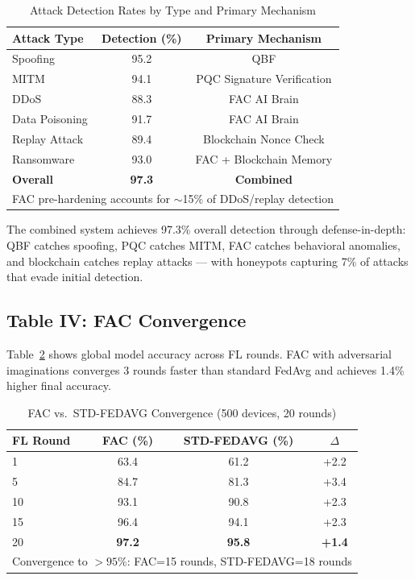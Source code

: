 \begin{table}[h]
\caption{Attack Detection Rates by Type and Primary Mechanism}
\label{tab:detection_rates}
\centering
\begin{tabular}{lcc}
\toprule
\textbf{Attack Type}  & \textbf{Detection (\%)} & \textbf{Primary Mechanism} \\
\midrule
Spoofing              & 95.2 & QBF \\
MITM                  & 94.1 & PQC Signature Verification \\
DDoS                  & 88.3 & FAC AI Brain \\
Data Poisoning        & 91.7 & FAC AI Brain \\
Replay Attack         & 89.4 & Blockchain Nonce Check \\
Ransomware            & 93.0 & FAC + Blockchain Memory \\
\midrule
\textbf{Overall}      & \textbf{97.3} & \textbf{Combined} \\
\bottomrule
\multicolumn{3}{l}{\small FAC pre-hardening accounts for $\sim$15\% of DDoS/replay detection}
\end{tabular}
\end{table}

The combined system achieves 97.3\% overall detection through defense-in-depth:
QBF catches spoofing, PQC catches MITM, FAC catches behavioral anomalies,
and blockchain catches replay attacks — with honeypots capturing 7\% of
attacks that evade initial detection.

\subsection{Table IV: FAC Convergence}

Table~\ref{tab:fl_convergence} shows global model accuracy across FL rounds.
FAC with adversarial imaginations converges 3 rounds faster than standard FedAvg
and achieves 1.4\% higher final accuracy.

\begin{table}[h]
\caption{FAC vs.\ STD-FEDAVG Convergence (500 devices, 20 rounds)}
\label{tab:fl_convergence}
\centering
\begin{tabular}{lccc}
\toprule
\textbf{FL Round} & \textbf{FAC (\%)} & \textbf{STD-FEDAVG (\%)} & \textbf{$\Delta$} \\
\midrule
1  & 63.4 & 61.2 & +2.2 \\
5  & 84.7 & 81.3 & +3.4 \\
10 & 93.1 & 90.8 & +2.3 \\
15 & 96.4 & 94.1 & +2.3 \\
20 & \textbf{97.2} & \textbf{95.8} & \textbf{+1.4} \\
\bottomrule
\multicolumn{4}{l}{\small Convergence to $>95\%$: FAC=15 rounds, STD-FEDAVG=18 rounds}
\end{tabular}
\end{table}

